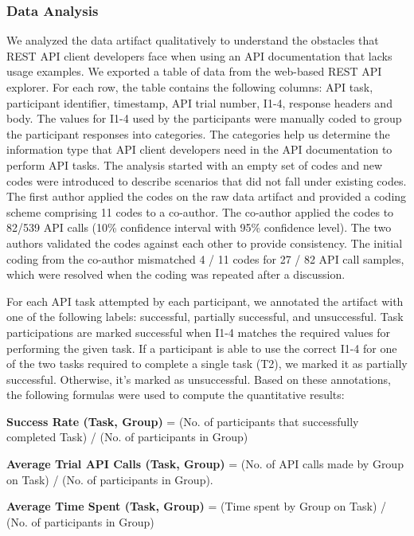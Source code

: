 \documentclass[conference]{IEEEtran}
\begin{document}
\subsubsection{Data Analysis}
We analyzed the data artifact qualitatively to understand the obstacles that REST API client developers face when using an API documentation that lacks usage examples. We exported a table of data from the web-based REST API explorer. For each row, the table contains the following columns: API task, participant identifier, timestamp, API trial number, I1-4, response headers and body. The values for I1-4 used by the participants were manually coded to group the participant responses into categories. The categories help us determine the information type that API client developers need in the API documentation to perform API tasks. The analysis started with an empty set of codes and new codes were introduced to describe scenarios that did not fall under existing codes. The first author applied the codes on the raw data artifact and provided a coding scheme comprising 11 codes to a co-author. The co-author applied the codes to 82/539 API calls (10\% confidence interval with 95\% confidence level). The two authors validated the codes against each other to provide consistency. The initial coding from the co-author mismatched 4 / 11 codes for 27 / 82 API call samples, which were resolved when the coding was repeated after a discussion.

For each API task attempted by each participant, we annotated the artifact with one of the following labels: successful, partially successful, and unsuccessful. Task participations are marked successful when I1-4 matches the required values for performing the given task. If a participant is able to use the correct I1-4 for one of the two tasks required to complete a single task (T2), we marked it as partially successful. Otherwise, it's marked as unsuccessful. Based on these annotations, the following formulas were used to compute the quantitative results:



\textbf{Success Rate (Task, Group)} = (No. of participants that successfully completed Task) / (No. of participants in Group)

\textbf{Average Trial API Calls (Task, Group)} = (No. of API calls made by Group on Task) / (No. of participants in Group).

\textbf{Average Time Spent (Task, Group)} = (Time spent by Group on Task) / (No. of participants in Group)
\end{document}
